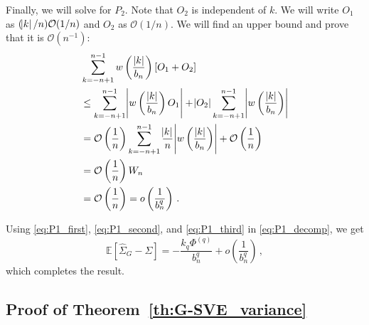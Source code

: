 \documentclass[11pt]{article}
\theoremstyle{remark}
\begin{document}
  Finally, we will solve for $P_2$. Note that $O_2$ is independent of $k$. We will write $O_1$ as $(\abs{k}/n)\mathcal{O}(1/n)$ and $O_2$ as $\mathcal{O}(1/n)$. We will find an upper bound and prove that it is $\mathcal{O}\left(n^{-1}\right)$:
  \begin{align*}
      &  \sum_{k=-n+1}^{n-1}w\left(\dfrac{|k|}{b_n}\right)\left[ O_1 + O_2 \right]  \\
      & \leq \sum_{k=-n+1}^{n-1}\abs{w\left(\dfrac{|k|}{b_n}\right)O_1} + \abs{O_2}\sum_{k=-n+1}^{n-1}\abs{w\left(\dfrac{|k|}{b_n}\right)} \\
      &= \mathcal{O}\left(\dfrac{1}{n}\right)\sum_{k=-n+1}^{n-1}\dfrac{\abs{k}}{n}\abs{w\left(\dfrac{|k|}{b_n}\right)} + \mathcal{O}\left(\dfrac{1}{n}\right)\\
      &= \mathcal{O}\left(\dfrac{1}{n}\right) W_n \\
      &= \mathcal{O}\left(\dfrac{1}{n}\right) = o\left(\dfrac{1}{b_n^q}\right) \,.
 \end{align*}
 
%
Using \eqref{eq:P1_first}, \eqref{eq:P1_second}, and \eqref{eq:P1_third} in \eqref{eq:P1_decomp}, we get
\[
\mathbb{E} \left[\hat{\Sigma}_{G} - \Sigma \right] = -\dfrac{k_q \Phi^{(q)} }{b_n^q} + o\left( \dfrac{1}{b_n^q} \right)\,,
\]
which completes the result.
%

\subsection{Proof of Theorem~\ref{th:G-SVE_variance}}
\label{appendix:variance}
 
\end{document}
